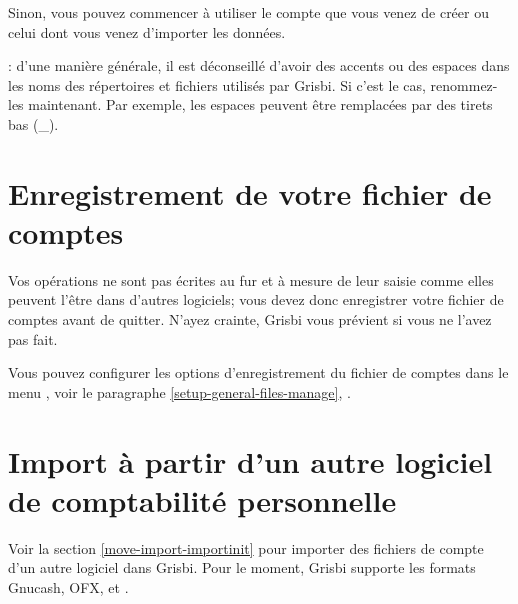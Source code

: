 Sinon, vous pouvez commencer à utiliser le compte que vous venez de créer ou celui dont vous venez d'importer les données.

\textcolor{red}{}: d'une manière générale, il est déconseillé d'avoir des accents ou des espaces dans les noms des répertoires et fichiers utilisés par Grisbi. Si c'est le cas, renommez-les maintenant. Par exemple, les espaces peuvent être remplacées par des tirets bas (\_).



\section{Enregistrement de votre fichier de comptes\label{start-save}}


Vos opérations ne sont pas écrites au fur et à mesure de leur saisie comme elles peuvent l'être dans d'autres logiciels; vous devez donc enregistrer votre fichier de comptes avant de quitter. N'ayez crainte, Grisbi vous prévient si vous ne l'avez pas fait. 

Vous pouvez configurer les options d'enregistrement du fichier de comptes dans le menu , voir le paragraphe \vref{setup-general-files-manage}, .


\section{Import à partir d'un autre logiciel de comptabilité personnelle}

Voir la section \vref{move-import-importinit} pour importer des fichiers de compte d'un autre logiciel dans Grisbi. Pour le moment, Grisbi supporte les formats \gls{Gnucash}, \gls{OFX},  et .


